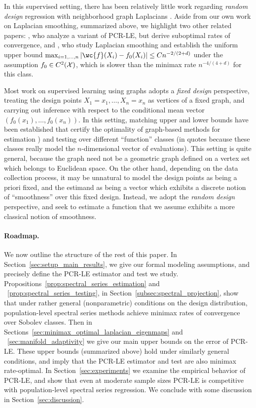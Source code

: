 In this supervised setting, there has been relatively little work regarding \emph{random design} regression with neighborhood graph Laplacians . Aside from our own work on Laplacian smoothing, summarized above, we highlight two other related papers: \citet{lee2016}, who analyze a variant of PCR-LE, but derive suboptimal rates of convergence, and \citet{trillos2020}, who study Laplacian smoothing and establish the uniform upper bound $\max_{i = 1,\ldots,n}|\wc{f}(X_i) - f_0(X_i)| \leq C n^{-2/(2 + d)}$ under the assumption $f_0 \in C^2(\mathcal{X})$, which is slower than the minimax rate $n^{-4/(4 + d)}$ for this class. 

Most work on supervised learning using graphs adopts a \emph{fixed design} perspective, treating the design points $X_1 = x_1,\ldots,X_n = x_n$ as vertices of a fixed graph, and carrying out inference with respect to the conditional mean vector $(f_0(x_1),\ldots,f_0(x_n))$. In this setting, matching upper and lower bounds have been established that certify the optimality of graph-based methods for estimation \citep{wang2016,hutter2016,sadhanala16,sadhanala17,kirichenko2017,kirichenko2018}) and testing \citep{sharpnack2010identifying,sharpnack2013b,sharpnack2013,sharpnack2015} over different ``function'' classes (in quotes because these classes really model the $n$-dimensional vector of evaluations). This setting is quite general, because the graph need not be a geometric graph defined on a vertex set which belongs to Euclidean space. On the other hand, depending on the data collection process, it may be unnatural to model the design points as being a priori fixed, and the estimand as being a vector which exhibits a discrete notion of ``smoothness'' over this fixed design. Instead, we adopt the \emph{random design} perspective, and seek to estimate a function that we assume exhibits a more classical notion of smoothness. 

\paragraph{Roadmap.}
We now outline the structure of the rest of this paper. In Section~\ref{sec:setup_main_results}, we give our formal modeling assumptions, and precisely define the PCR-LE estimator and test we study. Propositions~\ref{prop:spectral_series_estimation} and ~\ref{prop:spectral_series_testing}, in Section~\ref{subsec:spectral_projection}, show that under rather general (nonparametric) conditions on the design distribution, population-level spectral series methods achieve minimax rates of convergence over Sobolev classes. Then in Sections~\ref{sec:minimax_optimal_laplacian_eigenmaps} and ~\ref{sec:manifold_adaptivity} we give our main upper bounds on the error of PCR-LE. These upper bounds (summarized above) hold under similarly general conditions, and imply that the PCR-LE estimator and test are also minimax rate-optimal. In Section~\ref{sec:experiments} we examine the empirical behavior of PCR-LE, and show that even at moderate sample sizes PCR-LE is competitive with population-level spectral series regression. We conclude with some discussion in Section~\ref{sec:discussion}. 

